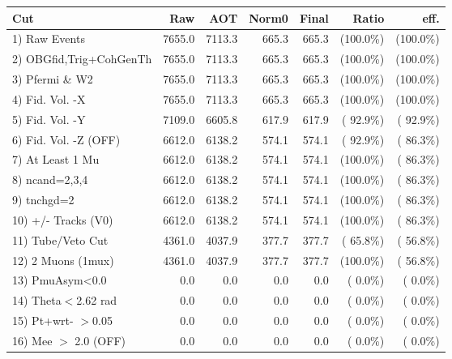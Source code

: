  \begin{table}[h!]\centering
 \begin{tabular}{||l||r|r|r|r|r|r||}
 \hline
 \hline
 Cut & Raw & AOT & Norm0 & Final & Ratio & eff.       \\
 \hline
  1) Raw Events           &       7655.0 &       7113.3 &        665.3 &        665.3 & (100.0\%) & (100.0\%) \\
  2) OBGfid,Trig+CohGenTh &       7655.0 &       7113.3 &        665.3 &        665.3 & (100.0\%) & (100.0\%) \\
  3) Pfermi \& W2         &       7655.0 &       7113.3 &        665.3 &        665.3 & (100.0\%) & (100.0\%) \\
  4) Fid. Vol. -X         &       7655.0 &       7113.3 &        665.3 &        665.3 & (100.0\%) & (100.0\%) \\
  5) Fid. Vol. -Y         &       7109.0 &       6605.8 &        617.9 &        617.9 & ( 92.9\%) & ( 92.9\%) \\
  6) Fid. Vol. -Z (OFF)   &       6612.0 &       6138.2 &        574.1 &        574.1 & ( 92.9\%) & ( 86.3\%) \\
  7) At Least 1 Mu        &       6612.0 &       6138.2 &        574.1 &        574.1 & (100.0\%) & ( 86.3\%) \\
  8) ncand=2,3,4          &       6612.0 &       6138.2 &        574.1 &        574.1 & (100.0\%) & ( 86.3\%) \\
  9) tnchgd=2             &       6612.0 &       6138.2 &        574.1 &        574.1 & (100.0\%) & ( 86.3\%) \\
 10) +/- Tracks (V0)      &       6612.0 &       6138.2 &        574.1 &        574.1 & (100.0\%) & ( 86.3\%) \\
 11) Tube/Veto Cut        &       4361.0 &       4037.9 &        377.7 &        377.7 & ( 65.8\%) & ( 56.8\%) \\
 12) 2 Muons (1mux)       &       4361.0 &       4037.9 &        377.7 &        377.7 & (100.0\%) & ( 56.8\%) \\
 13) PmuAsym<0.0          &          0.0 &          0.0 &          0.0 &          0.0 & (  0.0\%) & (  0.0\%) \\
 14) Theta$<$2.62 rad     &          0.0 &          0.0 &          0.0 &          0.0 & (  0.0\%) & (  0.0\%) \\
 15) Pt+wrt- $>$0.05      &          0.0 &          0.0 &          0.0 &          0.0 & (  0.0\%) & (  0.0\%) \\
 16) Mee $>$ 2.0  (OFF)   &          0.0 &          0.0 &          0.0 &          0.0 & (  0.0\%) & (  0.0\%) \\

\end{tabular}
\end{table}
